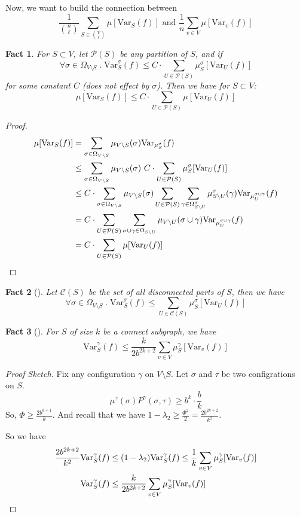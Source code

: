 \documentclass{article}
\newtheorem{fact}{Fact}[section]
\def\Var{\mathrm{Var}}
\begin{document}
Now, we want to build the connection between
\[\frac{1}{\binom{n}{\ell}} \sum_{S\in\binom{V}{\ell}}\mu[\Var_S(f)] \mbox{ and } \frac{1}{n}\sum_{v\in V} \mu[\Var_v(f)]\]

\begin{fact}
  For $S\subset V$, let $\mathcal{P}(S)$ be any partition of $S$, and if 
  \[\forall \sigma \in \Omega_{V\setminus S} \;.\; \Var_S^\sigma(f) \leq C \cdot \sum_{U\in \mathcal{P}(S)} \mu^\sigma_S[\Var_U(f)]\] for some constant $C$ (does not effect by $\sigma$).
  Then we have for $S\subset V$:
  \[\mu[\Var_S(f)] \leq C\cdot \sum_{U\in\mathcal{P}(S)} \mu[\Var_U(f)]\]
\end{fact}

\begin{proof}
  \begin{align*}
    \mu[\Var_S(f)]
    &= \sum_{\sigma\in\Omega_{V\setminus S}}\mu_{V\setminus S}(\sigma) \Var_{\mu^\sigma_S}(f) \\
    &\leq \sum_{\sigma\in\Omega_{V\setminus S}}\mu_{V\setminus S}(\sigma)\  C\cdot \sum_{U\in\mathcal{P}(S)} \mu^\sigma_S[\Var_U(f)] \\
    &\leq C\cdot \sum_{\sigma\in\Omega_{V\setminus S}}\mu_{V\setminus S}(\sigma) \sum_{U\in\mathcal{P}(S)} \sum_{\gamma\in\Omega^\sigma_{S\setminus U}}\mu^\sigma_{S\setminus U}(\gamma) \Var_{\mu^{\sigma\cup\gamma}_U}(f) \\
    &= C\cdot \sum_{U\in\mathcal{P}(S)} \sum_{\sigma\cup\gamma\in \Omega_{S\setminus U}} \mu_{V\setminus U} (\sigma\cup\gamma) \Var_{\mu^{\sigma\cup\gamma}_U}(f) \\
    &= C\cdot \sum_{U\in\mathcal{P}(S)} \mu[\Var_U(f)] \qedhere
  \end{align*}
\end{proof}

\begin{fact}[\cite{CLV20-1}]
  Let $\mathcal{C}(S)$ be the set of all disconnected parts of $S$, then we have
  \[\forall \sigma\in \Omega_{V\setminus S} \;.\; \Var_S^\sigma (f) \leq \sum_{U\in\mathcal{C}(S)} \mu^\sigma_S[\Var_U(f)]\]
\end{fact}

\begin{fact}[\cite{CLV20-1}]
  For $S$ of size $k$ be a connect subgraph, we have
  \[\Var^\gamma_S(f) \leq \frac{k}{2b^{2k+2}}\sum_{v\in V} \mu^\gamma_S[\Var_v(f)]\]
\end{fact}
\begin{proof}[Proof Sketch]
  Fix any configuration $\gamma$ on $V\setminus S$.
  Let $\sigma$ and $\tau$ be two configrations on $S$.
  \[\mu^\gamma(\sigma)P^\gamma(\sigma, \tau) \geq b^k\cdot\frac{b}{k}\]
  So, $\Phi \geq \frac{2b^{k+1}}{k}$.
  And recall that we have $1 - \lambda_2 \geq \frac{\Phi^2}{2} = \frac{2b^{2k+2}}{k^2}$.

  So we have 
  \begin{align*}
    \frac{2b^{2k+2}}{k^2}\Var_S^\gamma (f) &\leq (1 - \lambda_2)\Var_S^\gamma(f) \leq \frac{1}{k} \sum_{v\in V} \mu^\gamma_S[\Var_v(f)] \\
    \Var^\gamma_S(f) &\leq \frac{k}{2b^{2k+2}}\sum_{v\in V} \mu^\gamma_S[\Var_v(f)] \qedhere
  \end{align*}
\end{proof}
\end{document}
